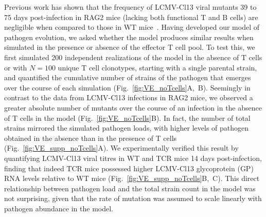 Previous work has shown that the frequency of LCMV-Cl13 viral mutants 39 to 75 days post-infection in RAG2\KO{} mice (lacking both functional T and B cells) are negligible when compared to those in WT mice~\cite{smyth2021characterization}. Having developed our model of pathogen evolution, we asked whether the model produces similar results when simulated in the presence or absence of the effector T cell pool. To test this, we first simulated 200 independent realizations of the model in the absence of T cells or with $N=100$ unique T cell clonotypes, starting with a single parental strain, and quantified the cumulative number of strains of the pathogen that emerges over the course of each simulation (Fig.~\ref{fig:VE_noTcells}A,~B). Seemingly in contrast to the data from LCMV-Cl13 infections in RAG2\KO{} mice, we observed a greater absolute number of mutants over the course of an infection in the absence of T cells in the model (Fig.~\ref{fig:VE_noTcells}B). In fact, the number of total strains mirrored the simulated pathogen loads, with higher levels of pathogen obtained in the absence than in the presence of T cells  (Fig.~\ref{fig:VE_supp_noTcells}A). We experimentally verified this result by quantifying LCMV-Cl13 viral titres in WT and TCR\textbeta{}\KO{} mice 14 days post-infection, finding that indeed TCR\textbeta{}\KO{} mice possessed higher LCMV-Cl13 glycoprotein (GP) RNA levels relative to WT mice (Fig.~\ref{fig:VE_supp_noTcells}B,~C). This direct relationship between pathogen load and the total strain count in the model was not surprising, given that the rate of mutation was assumed to scale linearly with pathogen abundance in the model.
%
